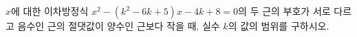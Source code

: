 $x$에 대한 이차방정식 $x^2-(k^2-6k+5)x-4k+8=0$의 두 근의 부호가 서로 다르고 음수인 근의 절댓값이 양수인 근보다 작을 때, 실수 $k$의 값의 범위를 구하시오.
